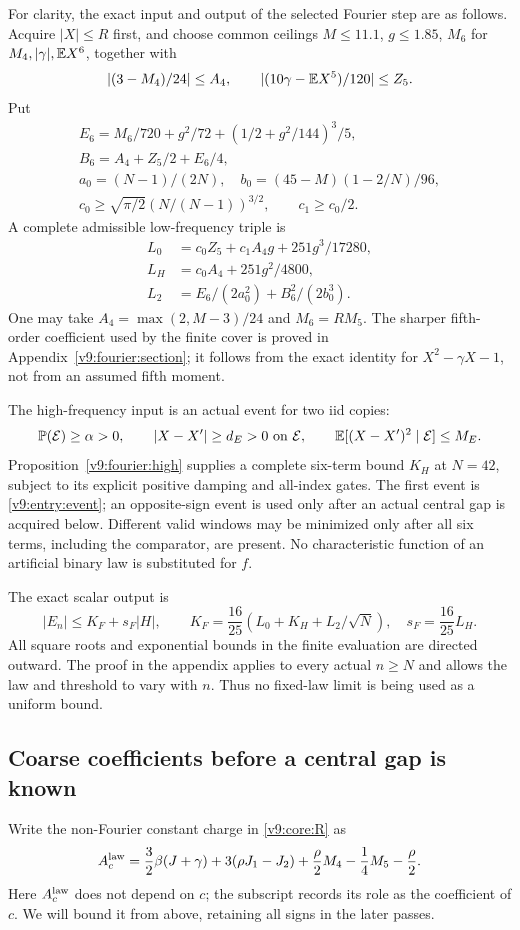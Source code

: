 For clarity, the exact input and output of the selected Fourier step
are as follows. Acquire $|X|\le R$ first, and choose common ceilings
$M\le11.1$, $g\le1.85$, $M_6$ for
$M_4,|\gamma|,\mathbb E X^6$, together with
\[
 |(3-M_4)/24|\le A_4,\qquad
 |(10\gamma-\mathbb E X^5)/120|\le Z_5.
\]
Put
\begin{gather*}
 E_6=M_6/720+g^2/72+(1/2+g^2/144)^3/5,\\
 B_6=A_4+Z_5/2+E_6/4,\\
 a_0=(N-1)/(2N),\quad b_0=(45-M)(1-2/N)/96,\\
 c_0\ge\sqrt{\pi/2}(N/(N-1))^{3/2},\qquad c_1\ge c_0/2.
\end{gather*}
A complete admissible low-frequency triple is
\begin{align*}
 L_0&=c_0Z_5+c_1A_4g+251g^3/17280,\\
 L_H&=c_0A_4+251g^2/4800,\\
 L_2&=E_6/(2a_0^2)+B_6^2/(2b_0^3).
\end{align*}
One may take $A_4=\max(2,M-3)/24$ and $M_6=R M_5$.
The sharper fifth-order coefficient used by the finite cover is proved
in Appendix~\ref{v9:fourier:section}; it follows from the exact
identity for $X^2-\gamma X-1$, not from an assumed fifth moment.

The high-frequency input is an actual event for two iid copies:
\[
 \mathbb P(\mathcal E)\ge\alpha>0,\qquad
 |X-X'|\ge d_E>0\text{ on }\mathcal E,\qquad
 \mathbb E[(X-X')^2\mid\mathcal E]\le M_E.
\]
Proposition~\ref{v9:fourier:high} supplies a complete six-term bound $K_H$
at $N=42$, subject to its explicit positive damping and all-index gates.
The first event is \eqref{v9:entry:event}; an opposite-sign event is
used only after an actual central gap is acquired below. Different valid
windows may be minimized only after all six terms, including the
comparator, are present. No characteristic function of an artificial
binary law is substituted for $f$.

The exact scalar output is
\begin{equation}\label{v9:entry:fourier-output}
 |E_n|\le K_F+s_F|H|,\qquad
 K_F=\frac{16}{25}(L_0+K_H+L_2/\sqrt N),\quad
 s_F=\frac{16}{25}L_H.
\end{equation}
All square roots and exponential bounds in the finite evaluation are
directed outward. The proof in the appendix applies to every actual
$n\ge N$ and allows the law and threshold to vary with $n$.
Thus no fixed-law limit is being used as a uniform bound.

\subsection{Coarse coefficients before a central gap is known}
\label{v9:entry:coarse-coefficients}
Write the non-Fourier constant charge in \eqref{v9:core:R} as
\[
 A_c^{\rm law}=\frac32\beta(J+\gamma)+3(\rho J_1-J_2)
                   +\frac\rho2M_4-\frac14M_5-\frac\rho2.
\]
Here $A_c^{\rm law}$ does not depend on $c$; the subscript records its
role as the coefficient of $c$. We will bound it from above, retaining
all signs in the later passes.


